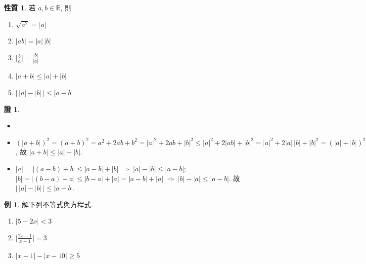 \documentclass[12pt,a4paper]{extarticle}
\newcommand{\ds}{\displaystyle}
\newcommand{\ie}{\;\Longrightarrow\;}
\theoremstyle{definition}
\newtheorem*{prp}{性質}
\newtheorem*{ex}{例}
\newtheorem*{prf}{證}
\begin{document}
\begin{prp}
  若 $a, b\in\mathbb{R}$, 則
  \setlength{\columnsep}{-20mm}
  \begin{multicols}{3}
    \begin{enumerate}\setlength\itemsep{0em}
      \item $\ds \sqrt{a^2} = |a|$
      \item $\ds |a b| = |a|\,|b|$
      \item $\ds \Big|\frac{b}{a}\Big| = \frac{|b|}{|a|}$
      \item $\ds |a + b|\leqslant|a| + |b|$
      \item $\ds \big|\,|a| - |b|\,\big|\leqslant|a - b|$
    \end{enumerate}
  \end{multicols}
\end{prp}

\begin{prf}
  \begin{itemize}\setlength\itemsep{0em}
    \item[]
    \item $\ds (|a + b|)^2 = (a + b)^2 = a^2 + 2 a b + b^2 = |a|^2 + 2 a b + |b|^2 \leqslant |a|^2 + 2 |a b| + |b|^2 = |a|^2 + 2 |a|\,|b| + |b|^2 = (|a| + |b|)^2$, 故 $\ds |a + b|\leqslant|a| + |b|$. 
    \item $\ds |a| = |(a - b) + b| \leqslant |a - b| + |b| \ie |a| - |b| \leqslant |a - b|$;  $\ds |b| = |(b - a) + a| \leqslant |b - a| + |a| = |a - b| + |a| \ie |b| - |a| \leqslant |a - b|$.  故 $\ds \big|\,|a| - |b|\,\big|\leqslant|a - b|$. 
  \end{itemize}
\end{prf}

\begin{ex}
  解下列不等式與方程式. 
  \setlength{\columnsep}{-20mm}
  \begin{multicols}{3}
    \begin{enumerate}\setlength\itemsep{0em}
      \item $\ds |5 - 2x| < 3$
      \item $\ds \Big|\frac{2 x - 1}{x + 1}\Big| = 3$
      \item $\ds |x - 1| - |x - 10|\geqslant 5$
    \end{enumerate}
  \end{multicols}
\end{ex}
\end{document}
